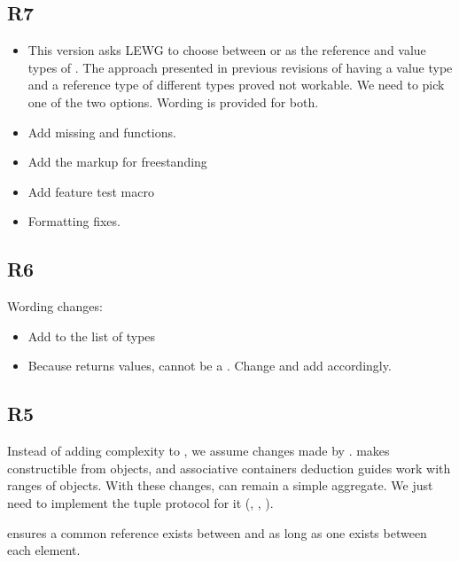 \documentclass{wg21}
\begin{document}
\subsection{R7}
\begin{itemize}
    \item This version asks LEWG to choose between  or  as the reference and value types of .
    The approach presented in previous revisions of having a value type and a reference type of different types proved not workable.
    We need to pick one of the two options. Wording is provided for both.

    \item Add missing  and  functions.
    \item Add the markup for freestanding
    \item Add feature test macro
    \item Formatting fixes.
\end{itemize}

\subsection{R6}
Wording changes:
\begin{itemize}
    \item Add  to the list of  types
    \item Because  returns values,  
    cannot be a . Change  and add  accordingly.
\end{itemize}

\subsection{R5}

Instead of adding complexity to , we assume changes made by .
 makes  constructible from  objects, and associative containers deduction guides work
with ranges of  objects.
With these changes,  can remain a simple aggregate. We just need to implement the tuple protocol for it (, , ).

 ensures a common reference exists between  and  as long as one exists between each element.
\end{document}
